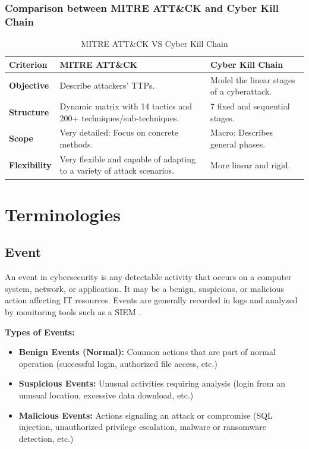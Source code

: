 \subsubsection{Comparison between MITRE ATT\&CK and Cyber Kill Chain}

\begin{table}[H]
\centering
\caption{MITRE ATT\&CK VS Cyber Kill Chain}
\label{tab:mitre-vs-killchain}
\renewcommand{\arraystretch}{1.4}
\begin{tabular}{>{\raggedright\arraybackslash}p{3cm} p{5cm} p{5cm}}
\toprule
\rowcolor{tableheader}
\textbf{Criterion} & \textbf{MITRE ATT\&CK} & \textbf{Cyber Kill Chain} \\
\midrule
\textbf{Objective} & Describe attackers' TTPs. & Model the linear stages of a cyberattack. \\
\midrule
\textbf{Structure} & Dynamic matrix with 14 tactics and 200+ techniques/sub-techniques. & 7 fixed and sequential stages. \\
\midrule
\textbf{Scope} & Very detailed: Focus on concrete methods. & Macro: Describes general phases. \\
\midrule
\textbf{Flexibility} & Very flexible and capable of adapting to a variety of attack scenarios. & More linear and rigid. \\
\bottomrule
\end{tabular}
\end{table}

\section{Terminologies}
\label{sec:terminologies}

\subsection{Event}
\label{subsec:event}

An event in cybersecurity is any detectable activity that occurs on a computer system, network, or application. It may be a benign, suspicious, or malicious action affecting IT resources. Events are generally recorded in logs and analyzed by monitoring tools such as a SIEM \cite{ref24}.

\textbf{Types of Events:}

\begin{itemize}
    \item \textbf{Benign Events (Normal):} Common actions that are part of normal operation (successful login, authorized file access, etc.)
    \item \textbf{Suspicious Events:} Unusual activities requiring analysis (login from an unusual location, excessive data download, etc.)
    \item \textbf{Malicious Events:} Actions signaling an attack or compromise (SQL injection, unauthorized privilege escalation, malware or ransomware detection, etc.)
\end{itemize}

